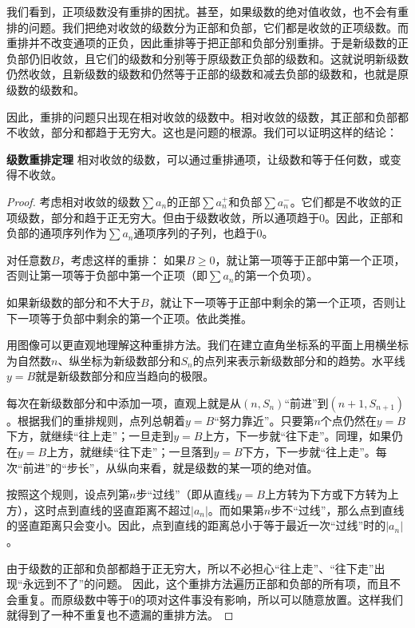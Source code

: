 \documentclass[12pt,UTF8]{ctexbook}
\begin{document}
我们看到，正项级数没有重排的困扰。甚至，如果级数的绝对值收敛，也不会有重排的问题。我们把绝对收敛的级数分为正部和负部，它们都是收敛的正项级数。而重排并不改变通项的正负，因此重排等于把正部和负部分别重排。于是新级数的正负部仍旧收敛，且它们的级数和分别等于原级数正负部的级数和。这就说明新级数仍然收敛，且新级数的级数和仍然等于正部的级数和减去负部的级数和，也就是原级数的级数和。

因此，重排的问题只出现在相对收敛的级数中。相对收敛的级数，其正部和负部都不收敛，部分和都趋于无穷大。这也是问题的根源。我们可以证明这样的结论：
\begin{tm}{\textbf{级数重排定理}}
    相对收敛的级数，可以通过重排通项，让级数和等于任何数，或变得不收敛。
\end{tm}

\begin{proof}
    考虑相对收敛的级数$\sum a_n$的正部$\sum a_n^+$和负部$\sum a_n^-$。它们都是不收敛的正项级数，部分和趋于正无穷大。但由于级数收敛，所以通项趋于$0$。因此，正部和负部的通项序列作为$\sum a_n$通项序列的子列，也趋于$0$。

    对任意数$B$，考虑这样的重排：
    如果$B\geqslant 0$，就让第一项等于正部中第一个正项，否则让第一项等于负部中第一个正项（即$\sum a_n$的第一个负项）。

    如果新级数的部分和不大于$B$，就让下一项等于正部中剩余的第一个正项，否则让下一项等于负部中剩余的第一个正项。依此类推。

    用图像可以更直观地理解这种重排方法。我们在建立直角坐标系的平面上用横坐标为自然数$n$、纵坐标为新级数部分和$S_n$的点列来表示新级数部分和的趋势。水平线$y = B$就是新级数部分和应当趋向的极限。

    每次在新级数部分和中添加一项，直观上就是从$(n, S_n)$“前进”到$(n+1, S_{n+1})$。根据我们的重排规则，点列总朝着$y=B$“努力靠近”。只要第$n$个点仍然在$y = B$下方，就继续“往上走”；一旦走到$y = B$上方，下一步就“往下走”。同理，如果仍在$y = B$上方，就继续“往下走”；一旦落到$y = B$下方，下一步就“往上走”。每次“前进”的“步长”，从纵向来看，就是级数的某一项的绝对值。

    按照这个规则，设点列第$n$步“过线”（即从直线$y = B$上方转为下方或下方转为上方），这时点到直线的竖直距离不超过$|a_n|$。而如果第$n$步不“过线”，那么点到直线的竖直距离只会变小。因此，点到直线的距离总小于等于最近一次“过线”时的$|a_n|$。

    由于级数的正部和负部都趋于正无穷大，所以不必担心“往上走”、“往下走”出现“永远到不了”的问题。
    因此，这个重排方法遍历正部和负部的所有项，而且不会重复。而原级数中等于$0$的项对这件事没有影响，所以可以随意放置。这样我们就得到了一种不重复也不遗漏的重排方法。
    

\end{proof}
\end{document}
